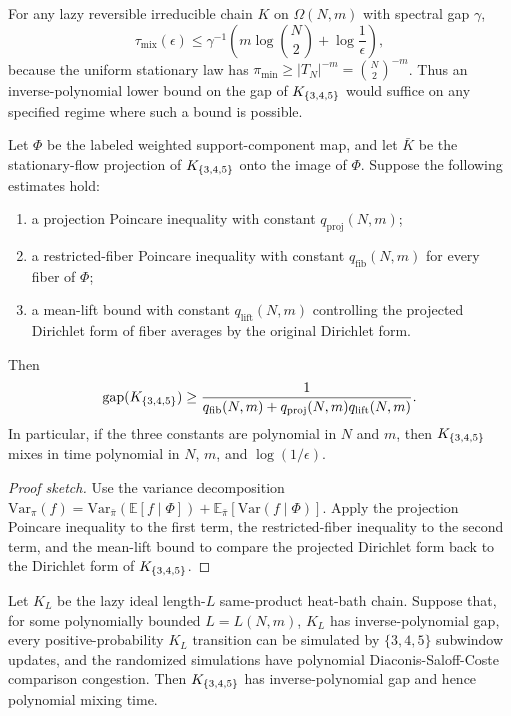 For any lazy reversible irreducible chain $K$ on $\Omega(N,m)$ with spectral
gap $\gamma$,
\[
  \tau_{\mathrm{mix}}(\epsilon)
  \le
  \gamma^{-1}\left(m\log\binom{N}{2}+\log\frac{1}{\epsilon}\right),
\]
because the uniform stationary law has
$\pi_{\min}\ge |T_N|^{-m}=\binom{N}{2}^{-m}$.  Thus an inverse-polynomial lower bound on the gap of $K_{\{3,4,5\}}$ would
suffice on any specified regime where such a bound is possible.

\begin{theorem}
Let $\Phi$ be the labeled weighted
support-component map, and let $\bar K$ be the stationary-flow projection of
$K_{\{3,4,5\}}$ onto the image of $\Phi$.  Suppose the following estimates hold:
\begin{enumerate}
\item a projection Poincare inequality with constant $q_{\mathrm{proj}}(N,m)$;
\item a restricted-fiber Poincare inequality with constant
  $q_{\mathrm{fib}}(N,m)$ for every fiber of $\Phi$;
\item a mean-lift bound with constant $q_{\mathrm{lift}}(N,m)$ controlling the
  projected Dirichlet form of fiber averages by the original Dirichlet form.
\end{enumerate}
Then
\[
  \mathrm{gap}(K_{\{3,4,5\}})
  \ge
  \frac{1}{q_{\mathrm{fib}}(N,m)
    +q_{\mathrm{proj}}(N,m)q_{\mathrm{lift}}(N,m)}.
\]
In particular, if the three constants are polynomial in $N$ and $m$, then
$K_{\{3,4,5\}}$ mixes in time polynomial in $N$, $m$, and $\log(1/\epsilon)$.
\end{theorem}

\begin{proof}[Proof sketch]
Use the variance decomposition
$\mathrm{Var}_{\pi}(f)=\mathrm{Var}_{\bar\pi}(\mathbb{E}[f\mid\Phi])+
\mathbb{E}_{\bar\pi}[\mathrm{Var}(f\mid\Phi)]$.  Apply the projection
Poincare inequality to the first term, the restricted-fiber inequality to the
second term, and the mean-lift bound to compare the projected Dirichlet form
back to the Dirichlet form of $K_{\{3,4,5\}}$.
\end{proof}

\begin{theorem}
Let $K_L$ be the lazy ideal length-$L$ same-product
heat-bath chain.  Suppose that, for some polynomially bounded $L=L(N,m)$,
$K_L$ has inverse-polynomial gap, every positive-probability $K_L$ transition
can be simulated by $\{3,4,5\}$ subwindow updates, and the randomized
simulations have polynomial Diaconis-Saloff-Coste comparison congestion.  Then
$K_{\{3,4,5\}}$ has inverse-polynomial gap and hence polynomial mixing time.
\end{theorem}

